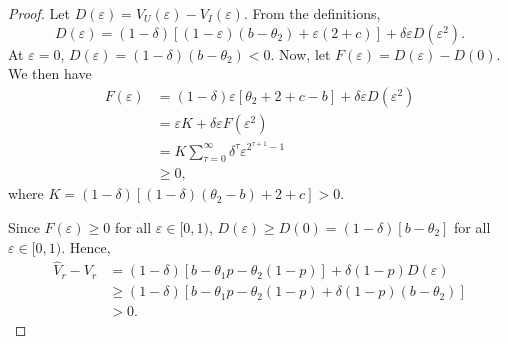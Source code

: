 \documentclass[12pt,letterpaper]{article}
\newtheorem{proposition}{\hskip\parindent\bf{Proposition}}
\newtheorem{lemma}{\hskip\parindent\bf{Lemma}}
\begin{document}
\begin{lemma}
\begin{proof}
        Let $D(\varepsilon)=V_U(\varepsilon)-V_I(\varepsilon)$. From the definitions, \begin{equation*}
            D(\varepsilon)=(1-\delta)[(1-\varepsilon)(b-\theta_2)+\varepsilon(2+c)] + \delta \varepsilon D(\varepsilon^2).
        \end{equation*} At $\varepsilon=0$, $D(\varepsilon)=(1-\delta)(b-\theta_2)<0$. Now, let $F(\varepsilon)=D(\varepsilon)-D(0)$. We then have \begin{align*}
            F(\varepsilon) &= (1-\delta)\varepsilon[\theta_2 + 2 + c - b] + \delta \varepsilon D(\varepsilon^2)\\
            &= \varepsilon K+\delta \varepsilon F(\varepsilon^2) \\
            &= K\sum_{\tau = 0}^\infty \delta^\tau \varepsilon^{2^{\tau+1}-1}\\
            &\geq 0,
        \end{align*} where $K=(1-\delta)[(1-\delta)(\theta_2-b)+2+c]>0$.

        Since $F(\varepsilon)\geq 0$ for all $\varepsilon\in [0,1)$, $D(\varepsilon)\geq D(0)=(1-\delta)[b-\theta_2]$ for all $\varepsilon\in [0,1)$. Hence, \begin{align*}
            \hat{V}_r-V_r &= (1-\delta)[b-\theta_1p-\theta_2(1-p)] + \delta (1-p)D(\varepsilon)\\
            &\geq (1-\delta)[b-\theta_1p-\theta_2(1-p) + \delta (1-p)(b-\theta_2)]\\
            &>0.
        \end{align*} 
    \end{proof}
\end{lemma}








\end{document}
